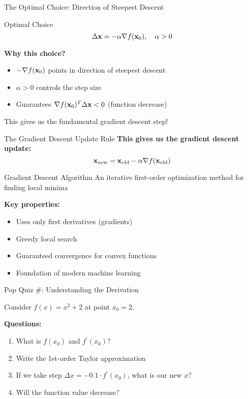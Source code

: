 \documentclass[usenames,dvipsnames]{beamer}
\begin{document}
  \begin{frame}{The Optimal Choice: Direction of Steepest Descent}
    \begin{definitionbox}{Optimal Choice}
    $$\Delta \mathbf{x} = -\alpha \nabla f(\mathbf{x}_0), \quad \alpha > 0$$
    \end{definitionbox}
    
    \pause
    \textbf{Why this choice?}
    \begin{itemize}[<+->]
        \item $-\nabla f(\mathbf{x}_0)$ points in direction of steepest descent
        \item $\alpha > 0$ controls the step size
        \item Guarantees $\nabla f(\mathbf{x}_0)^T \Delta\mathbf{x} < 0$ (function decrease)
    \end{itemize}
    
    \pause
    \begin{keypointsbox}{}
    This gives us the fundamental gradient descent step!
    \end{keypointsbox}
  \end{frame}

  \begin{frame}{The Gradient Descent Update Rule}
    \textbf{This gives us the gradient descent update:}
    $$\mathbf{x}_{\text{new}} = \mathbf{x}_{\text{old}} - \alpha \nabla f(\mathbf{x}_{\text{old}})$$
    
    \pause
    \begin{definitionbox}{Gradient Descent Algorithm}
    An iterative first-order optimization method for finding local minima
    \end{definitionbox}
    
    \pause
    \textbf{Key properties:}
    \begin{itemize}[<+->]
        \item Uses only first derivatives (gradients)
        \item Greedy local search
        \item Guaranteed convergence for convex functions
        \item Foundation of modern machine learning
    \end{itemize}
  \end{frame}

  \begin{frame}{Pop Quiz \#\thepopquiz: Understanding the Derivation}
    \begin{popquizbox}{\thepopquiz}
    Consider $f(x) = x^2 + 2$ at point $x_0 = 2$.
    
    \textbf{Questions:}
    \begin{enumerate}
        \item What is $f(x_0)$ and $f^{\prime}(x_0)$?
        \item Write the 1st-order Taylor approximation
        \item If we take step $\Delta x = -0.1 \cdot f^{\prime}(x_0)$, what is our new $x$?
        \item Will the function value decrease?
    \end{enumerate}
    \end{popquizbox}
  \end{frame}
\end{document}
